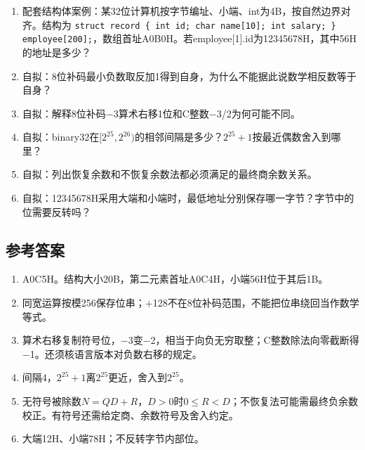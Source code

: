 \begin{recallcard}[主动回忆·自拟]

\begin{enumerate}
\def\labelenumi{\arabic{enumi}.}
\setcounter{enumi}{3}
\tightlist
\item
  配套结构体案例：某32位计算机按字节编址、小端、int为4B，按自然边界对齐。结构为 \texttt{struct record \{ int id;\allowbreak{} char name[10];\allowbreak{} int salary;\allowbreak{} \} employee[200];\allowbreak{}}，数组首址A0B0H。若employee{[}1{]}.id为12345678H，其中56H的地址是多少？
\item
  自拟：8位补码最小负数取反加1得到自身，为什么不能据此说数学相反数等于自身？
\item
  自拟：解释8位补码\ensuremath{-}3算术右移1位和C整数\ensuremath{-}3/2为何可能不同。
\item
  自拟：binary32在\([2^{25},2^{26})\)的相邻间隔是多少？\(2^{25}+1\)按最近偶数舍入到哪里？
\item
  自拟：列出恢复余数和不恢复余数法都必须满足的最终商余数关系。
\item
  自拟：12345678H采用大端和小端时，最低地址分别保存哪一字节？字节中的位需要反转吗？
\end{enumerate}

\end{recallcard}

\subsection{参考答案}\label{CO02-answers}

\begin{enumerate}
\def\labelenumi{\arabic{enumi}.}
\setcounter{enumi}{3}
\tightlist
\item
  A0C5H。结构大小20B，第二元素首址A0C4H，小端56H位于其后1B。
\item
  同宽运算按模256保存位串；+128不在8位补码范围，不能把位串绕回当作数学等式。
\item
  算术右移复制符号位，\ensuremath{-}3变\ensuremath{-}2，相当于向负无穷取整；C整数除法向零截断得\ensuremath{-}1。还须核语言版本对负数右移的规定。
\item
  间隔4，\(2^{25}+1\)离\(2^{25}\)更近，舍入到\(2^{25}\)。
\item
  无符号被除数\(N=QD+R\)，\(D>0\)时\(0\le R<D\)；不恢复法可能需最终负余数校正。有符号还需给定商、余数符号及舍入约定。
\item
  大端12H、小端78H；不反转字节内部位。
\end{enumerate}
